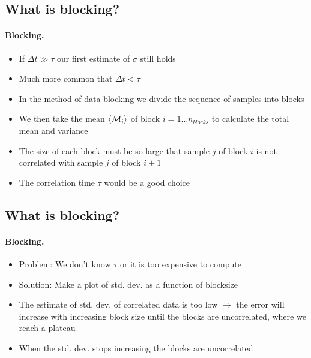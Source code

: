\documentclass[%
twoside,                 %
final,                   %
10pt]{article}
\begin{document}
    

\subsection{What is blocking?}

\paragraph{Blocking.}
\begin{itemize}
    \item If $\Delta t\gg\tau$ our first estimate of $\sigma$ still holds

    \item Much more common that $\Delta t<\tau$

    \item In the method of data blocking we divide the sequence of samples into blocks

    \item We then take the mean $\langle {\cal M}_i\rangle$ of block $i=1\ldots n_{blocks}$ to calculate the total mean and variance

    \item The size of each block must be so large that sample $j$ of block $i$ is not correlated with sample $j$ of block $i+1$

    \item The correlation time $\tau$ would be a good choice
\end{itemize}

\noindent



\subsection{What is blocking?}

\paragraph{Blocking.}
\begin{itemize}
    \item Problem: We don't know $\tau$ or it is too expensive to compute

    \item Solution: Make a plot of std. dev. as a function of blocksize

    \item The estimate of std. dev. of correlated data is too low $\to$ the error will increase with increasing block size until the blocks are uncorrelated, where we reach a plateau

    \item When the std. dev. stops increasing the blocks are uncorrelated
\end{itemize}
\end{document}
